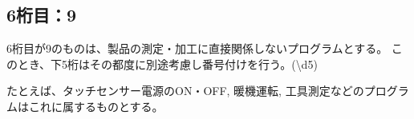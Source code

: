 \subsection{6桁目：9}
6桁目が9のものは、製品の測定・加工に直接関係しないプログラムとする。
このとき、下5桁はその都度に別途考慮し番号付けを行う。({\textbackslash d{5}})
\begin{hosoku}
たとえば、タッチセンサー電源のON・OFF, 暖機運転, 工具測定などのプログラムはこれに属するものとする。
\end{hosoku}


